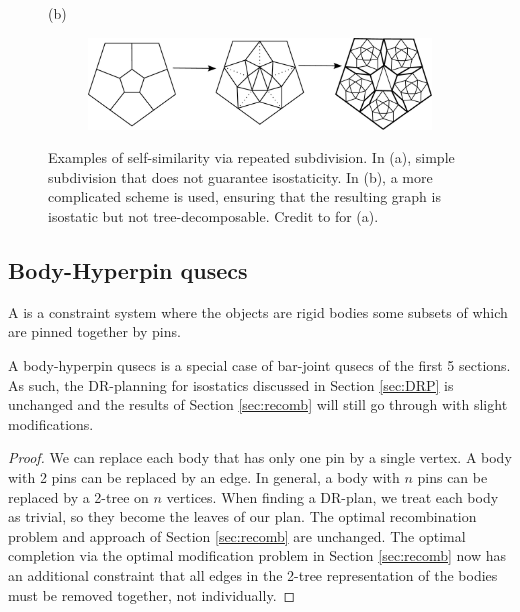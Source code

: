\begin{figure}
    (b)
    \begin{subfigure}{0.8\linewidth}
        \includegraphics[width=\linewidth]{img/pentawesome}
    \end{subfigure}
    \caption{Examples of self-similarity via repeated subdivision. In (a),
    simple subdivision that does not guarantee isostaticity. In (b), a more
complicated scheme is used, ensuring that the resulting graph is isostatic
but not  tree-decomposable. Credit to \cite{subdivision_paper} for (a).}
    \label{fig:subdivision}
\end{figure}

\subsection{Body-Hyperpin qusecs}


\begin{definition}
    A  is a constraint system where the objects are rigid bodies
    some subsets of which are pinned together by pins.
\end{definition}

\begin{remark}
\label{rem:bodypin_is_barjoint}
    A body-hyperpin qusecs is a special case of bar-joint qusecs of the
    first 5 sections. As such, the DR-planning for isostatics discussed in Section
    \ref{sec:DRP} is unchanged and the results of Section \ref{sec:recomb} will still go through with slight modifications.
\end{remark}

\begin{proof}
    We can replace each body that has only one pin by a single vertex. A
    body with 2 pins can be replaced by an edge. In general, a body with $n$
    pins can be replaced by a 2-tree on $n$ vertices. When finding a
    DR-plan, we treat each body as trivial, so they become the leaves of our
    plan. The optimal recombination problem and approach of Section
    \ref{sec:recomb} are unchanged. The optimal completion via the optimal modification problem in
Section \ref{sec:recomb} now has an additional constraint that all edges in the 2-tree representation of the bodies must be removed together, not individually.
\end{proof}

